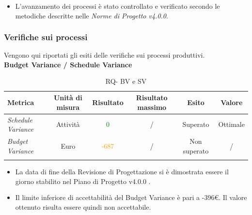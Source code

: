 {\begin{itemize}
    	\item L’avanzamento dei processi è stato controllato e verificato secondo le metodiche descritte nelle \emph{Norme di Progetto v4.0.0}.
    	
    \end{itemize}
    \subsubsection{Verifiche sui processi}
    
    Vengono qui riportati gli esiti delle verifiche sui processi produttivi.\\
    
    
    \textbf{Budget Variance / Schedule Variance}
     \begin{longtable}{|>{\centering}m{2cm}|c|c|c|c|c|}
     	\hline
     	\textbf{Metrica} & \textbf{Unità di misura} & \textbf{Risultato} & \textbf{Risultato massimo} & \textbf{Esito} & \textbf{Valore}\\
     	\hline
     	\endhead
     	\emph{Schedule Variance} & {Attività} & \textcolor{Green}{0} & / & Superato & Ottimale\\ \hline
     	\emph{Budget Variance} & {Euro} & \textcolor{Orange}{-687} & / & Non superato & /\\ \hline
    
    	\caption{RQ- BV e SV}\\
    \end{longtable}
    
    
    
    
    \begin{itemize}
    	\item La data di fine della Revisione di Progettazione si è dimostrata essere il
    	giorno stabilito nel Piano di Progetto v4.0.0 .
    	\item  Il limite inferiore di accettabilità del Budget Variance è pari a -396€.
    	Il valore ottenuto risulta essere quindi non accettabile. 
    \end{itemize}
    
}
